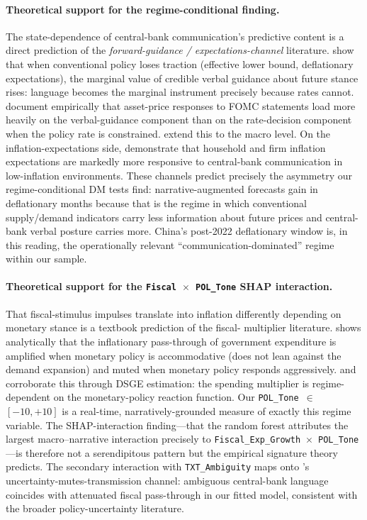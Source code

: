 \documentclass[AER]{AEA}
\begin{document}
\paragraph{Theoretical support for the regime-conditional finding.}
The state-dependence of central-bank communication's predictive content is
a direct prediction of the \emph{forward-guidance / expectations-channel}
literature. \citet{eggertsson2003zero} show that when conventional policy
loses traction (effective lower bound, deflationary expectations), the
marginal value of credible verbal guidance about future stance rises:
language becomes the marginal instrument precisely because rates cannot.
\citet{gurkaynak2005actions} document empirically that asset-price responses
to FOMC statements load more heavily on the verbal-guidance component than
on the rate-decision component when the policy rate is constrained.
\citet{campbell2012macroeconomic} extend this to the macro level. On the
inflation-expectations side, \citet{coibion2022monetary} demonstrate that
household and firm inflation expectations are markedly more responsive to
central-bank communication in low-inflation environments. These channels
predict precisely the asymmetry our regime-conditional DM tests find:
narrative-augmented forecasts gain in deflationary months because that is
the regime in which conventional supply/demand indicators carry less
information about future prices and central-bank verbal posture carries
more. China's post-2022 deflationary window is, in this reading, the
operationally relevant ``communication-dominated'' regime within our
sample.

\paragraph{Theoretical support for the
\texttt{Fiscal}~$\times$~\texttt{POL\_Tone} SHAP interaction.}
That fiscal-stimulus impulses translate into inflation differently
depending on monetary stance is a textbook prediction of the fiscal-
multiplier literature. \citet{woodford2011simple} shows analytically that
the inflationary pass-through of government expenditure is amplified when
monetary policy is accommodative (does not lean against the demand
expansion) and muted when monetary policy responds aggressively.
\citet{christiano2011government} and \citet{leeper2017clearing} corroborate
this through DSGE estimation: the spending multiplier is regime-dependent
on the monetary-policy reaction function. Our \texttt{POL\_Tone}~$\in$
$[-10, +10]$ is a real-time, narratively-grounded measure of exactly this
regime variable. The SHAP-interaction finding---that the random forest
attributes the largest macro--narrative interaction precisely to
\texttt{Fiscal\_Exp\_Growth}~$\times$~\texttt{POL\_Tone}---is therefore
not a serendipitous pattern but the empirical signature theory predicts.
The secondary interaction with \texttt{TXT\_Ambiguity} maps onto
\citet{bloom2009impact}'s uncertainty-mutes-transmission channel:
ambiguous central-bank language coincides with attenuated fiscal
pass-through in our fitted model, consistent with the broader
policy-uncertainty literature.
\end{document}
